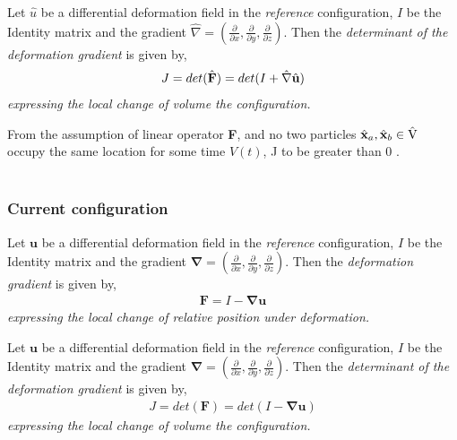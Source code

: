 \begin{defn}
Let $\hat{u}$ be a differential deformation field in the \textit{reference} configuration, $I$ be the Identity matrix and
the gradient $\hat{\nabla} = (\frac{\partial}{\partial x}, \frac{\partial}{\partial y}, \frac{\partial}{\partial z}) $. Then the \textit{determinant of the deformation gradient} is given by,
\begin{align}
J = det(\hat{\mathbf{F}}) = det( I + \hat{\nabla} \hat{\mathbf{u}} )
\end{align} 
\textit{expressing the local change of volume the configuration.}
\end{defn}

From the assumption of linear operator \textbf{F}, and no two particles $\hat{\mathbf{x}}_a, \hat{\mathbf{x}}_b \in \text{\^{V}}$ occupy the same location for some time $V(t)$,  J to be greater than 0 \cite{Wriggers2006}. \\ \\

\subsubsection*{Current configuration}
\begin{defn}
Let $\mathbf{u}$ be a differential deformation field in the \textit{reference} configuration, $I$ be the Identity matrix and
the gradient $\mathbf{\nabla} = (\frac{\partial}{\partial x}, \frac{\partial}{\partial y}, \frac{\partial}{\partial z}) $. Then the \textit{deformation gradient} is given by,
\begin{align}
\mathbf{F} = I - \mathbf{\nabla} \mathbf{u} 
\end{align} 
\textit{expressing the local change of relative position under deformation.}
\end{defn}

\begin{defn}
Let $\mathbf{u}$ be a differential deformation field in the \textit{reference} configuration, $I$ be the Identity matrix and
the gradient $\mathbf{\nabla} = (\frac{\partial}{\partial x}, \frac{\partial}{\partial y}, \frac{\partial}{\partial z}) $. Then the \textit{determinant of the deformation gradient} is given by,
\begin{align}
J = det(\mathbf{F}) = det( I - \mathbf{\nabla} \mathbf{u} )
\end{align} 
\textit{expressing the local change of volume the configuration.}
\end{defn}



